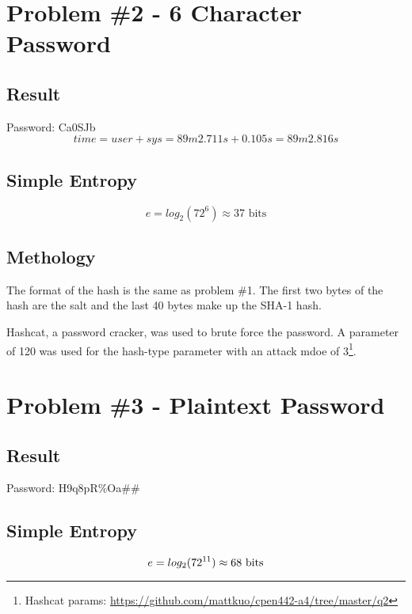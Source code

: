 \documentclass[conference]{IEEEtran}
\begin{document}
\section{Problem \#2 - 6 Character Password}

\subsection{Result}
  \noindent Password: Ca0SJb
  \begin{displaymath}
  time = user + sys = 89m2.711s + 0.105s = 89m2.816s
  \end{displaymath}

\subsection{Simple Entropy}
  \begin{displaymath}
    e = log_2(72^6) \approx 37 \mbox{ bits}
  \end{displaymath}

\subsection{Methology}

The format of the hash is the same as problem \#1. The first two bytes of the
hash are the salt and the last 40 bytes make up the SHA-1 hash.

Hashcat, a password cracker, was used to brute force the password. A parameter
of 120 was used for the hash-type parameter with an attack mdoe of
3\footnote{Hashcat params:
\url{https://github.com/mattkuo/cpen442-a4/tree/master/q2}}.

\section{Problem \#3 - Plaintext Password}
\subsection{Result}
  \noindent Password: H9q8pR\%Oa\#\#

\subsection{Simple Entropy}
  \begin{displaymath}
    e = log_2(72^{11}) \approx 68 \mbox{ bits}\\
  \end{displaymath}
\end{document}
